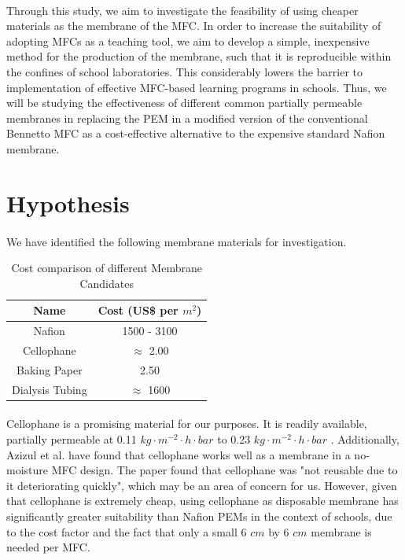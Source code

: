 \documentclass[12pt, twocolumn, a4paper]{article}
\begin{document}
\paragraph{}Through this study, we aim to investigate the feasibility of using cheaper materials as the membrane of the MFC. In order to increase the suitability of adopting MFCs as a teaching tool, we aim to develop a simple, inexpensive method for the production of the membrane, such that it is reproducible within the confines of school laboratories. This considerably lowers the barrier to implementation of effective MFC-based learning programs in schools. Thus, we will be studying the effectiveness of different common partially permeable membranes in replacing the PEM in a modified version of the conventional Bennetto MFC as a cost-effective alternative to the expensive standard Nafion\texttrademark{} membrane.
\section{Hypothesis}
\paragraph{}We have identified the following membrane materials for investigation. 
        \begin{center}
        \begin{table}[h]
        \begin{tabular}[H]{ |c|c| } 
         \hline
         {\small\textbf{Name}} & {\small\textbf{Cost}} {\footnotesize(US\$ per $m^2$)}\\
             \hline
             {\small Nafion} & {\small 1500 - 3100}\\
             {\small Cellophane} & $\approx$ {\small 2.00}\\
             {\small Baking Paper} & {\small 2.50}\\
             {\small Dialysis Tubing} & {\small$\approx$ 1600}\\
         \hline
         
        \end{tabular}
        \caption{Cost comparison of different Membrane Candidates}
        \end{table}
        \end{center}
    \paragraph{}Cellophane is a promising material for our purposes. It is readily available, partially permeable at 0.11 $kg\cdot m^{-2} \cdot h\cdot bar$ to 0.23 $kg\cdot m^{-2} \cdot h\cdot bar$ \cite{Makarov2022}. Additionally, Azizul et al. have found that cellophane works well as a membrane in a no-moisture MFC design. \cite{MOQSUD20132465} The paper found that cellophane was "not reusable due to it deteriorating quickly", which may be an area of concern for us. However, given that cellophane is extremely cheap, using cellophane as disposable membrane has significantly greater suitability than Nafion\texttrademark{} PEMs in the context of schools, due to the cost factor and the fact that only a small 6 $cm$ by 6 $cm$ membrane is needed per MFC.
    
\end{document}
